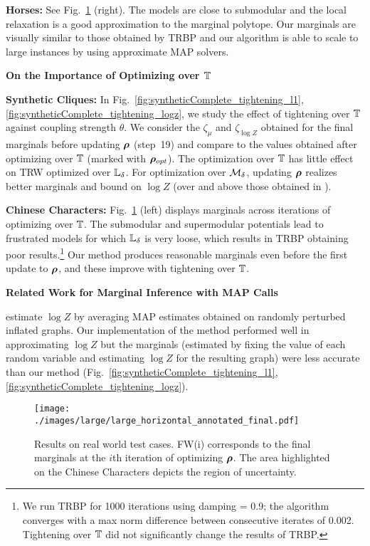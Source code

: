 \textbf{Horses:} See Fig.~\ref{fig:largeScale} (right). 
%
The models are close to submodular and the local relaxation is a
good approximation to the marginal polytope.
%
Our marginals are visually similar to those obtained by TRBP and our algorithm is able
to scale to large instances 
by using approximate MAP solvers. 
%
%
%
%
%
%


%
%
\vspace{1mm}
\centerline{\textbf{On the Importance of Optimizing over $\mathbb{T}$}}

\textbf{Synthetic Cliques: }
In Fig.~\ref{fig:syntheticComplete_tightening_l1}, \ref{fig:syntheticComplete_tightening_logz},
%
%
we study the effect 
of tightening over $\mathbb{T}$ against coupling strength $\theta$.
%
We consider the $\zeta_{\mu}$ and $\zeta_{\log Z}$ obtained for the final marginals before updating $\bm{\rho}$ (step~19)
and compare to the values obtained after optimizing over $\mathbb{T}$ (marked with $\bm{\rho}_{opt}$). 
%
%
The optimization over $\mathbb{T}$ has little effect on TRW optimized over $\mathbb{L}_\delta$. 
For optimization over $\mathcal{M}_\delta$,  
%
updating $\bm{\rho}$ realizes better marginals and bound on $\log Z$
%
(over and above 
those
%
obtained in 
\cite{sontag2007new}).

\textbf{Chinese Characters:} Fig.~\ref{fig:largeScale} (left) displays marginals across iterations of
optimizing over $\mathbb{T}$.
The submodular and supermodular potentials lead to frustrated models for
which $\mathbb{L}_\delta$ is very loose, which results in TRBP
obtaining poor results.\footnote{We run TRBP for 1000 iterations
  using damping = 0.9; the algorithm converges with a max norm difference between consecutive iterates of 0.002.
  Tightening over $\mathbb{T}$ did not significantly change the results of TRBP.}
Our method produces reasonable marginals even before the first
update to $\bm{\rho}$, and these improve with tightening over $\mathbb{T}$. 

\vspace{2mm}
\centerline{\textbf{Related Work for Marginal Inference with MAP Calls}}
%
%

\cite{hazan2012partition} estimate 
$\log Z$ by averaging MAP estimates obtained on randomly perturbed
inflated graphs. 
Our implementation of the method performed well 
in approximating $\log Z$ but the marginals (estimated by fixing the value of each
random variable and estimating $\log Z$ for the resulting graph) were
less accurate than our method (Fig.~\ref{fig:syntheticComplete_tightening_l1}, \ref{fig:syntheticComplete_tightening_logz}).

\begin{figure*}
\centering
\texttt{[image: ./images/large/large\_horizontal\_annotated\_final.pdf]}
%
\caption{\small{Results on real world test cases. FW(i) corresponds to the final marginals at the $i$th iteration of optimizing $\bm{\rho}$. The area highlighted on the Chinese Characters depicts the region of uncertainty.}\label{fig:largeScale}}
\end{figure*}
